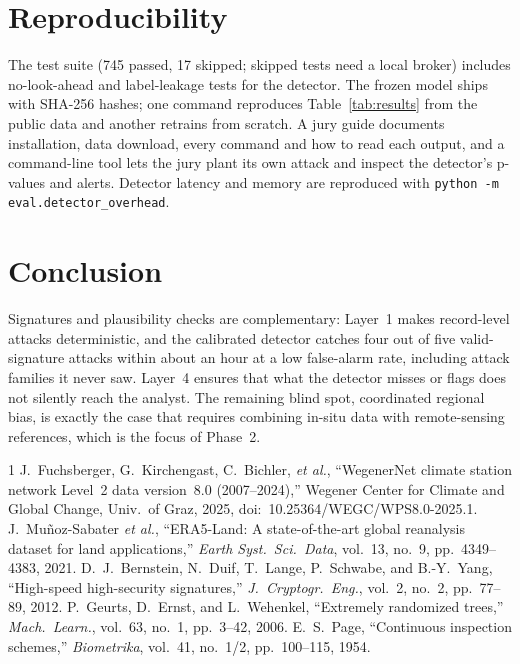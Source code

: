 \documentclass[conference]{IEEEtran}
\newcommand{\code}[1]{\texttt{\small #1}}
\begin{document}
\section{Reproducibility}

The test suite (745 passed, 17 skipped; skipped tests need a local broker) includes no-look-ahead and
label-leakage tests for the detector. The frozen model ships with SHA-256 hashes; one command reproduces
Table~\ref{tab:results} from the public data and another retrains from scratch. A jury guide documents
installation, data download, every command and how to read each output, and a command-line tool lets the jury
plant its own attack and inspect the detector's p-values and alerts. Detector latency and memory are
reproduced with \code{python -m eval.detector\_overhead}.

\section{Conclusion}

Signatures and plausibility checks are complementary: Layer~1 makes record-level attacks deterministic, and
the calibrated detector catches four out of five valid-signature attacks within about an hour at a low
false-alarm rate, including attack families it never saw. Layer~4 ensures that what the detector misses or
flags does not silently reach the analyst. The remaining blind spot, coordinated regional bias, is exactly the
case that requires combining in-situ data with remote-sensing references, which is the focus of Phase~2.

\balance
\begin{thebibliography}{1}
J.~Fuchsberger, G.~Kirchengast, C.~Bichler, \emph{et al.}, ``WegenerNet climate station network Level~2 data
version~8.0 (2007--2024),'' Wegener Center for Climate and Global Change, Univ.\ of Graz, 2025,
doi:~10.25364/WEGC/WPS8.0-2025.1.
J.~Mu\~noz-Sabater \emph{et al.}, ``ERA5-Land: A state-of-the-art global reanalysis dataset for land
applications,'' \emph{Earth Syst.\ Sci.\ Data}, vol.~13, no.~9, pp.~4349--4383, 2021.
D.~J.~Bernstein, N.~Duif, T.~Lange, P.~Schwabe, and B.-Y.~Yang, ``High-speed high-security signatures,''
\emph{J.\ Cryptogr.\ Eng.}, vol.~2, no.~2, pp.~77--89, 2012.
P.~Geurts, D.~Ernst, and L.~Wehenkel, ``Extremely randomized trees,'' \emph{Mach.\ Learn.}, vol.~63, no.~1,
pp.~3--42, 2006.
E.~S.~Page, ``Continuous inspection schemes,'' \emph{Biometrika}, vol.~41, no.~1/2, pp.~100--115, 1954.
\end{thebibliography}
\end{document}
